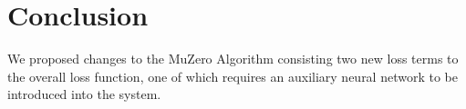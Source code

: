 \section{Conclusion}
We proposed changes to the MuZero Algorithm consisting two new loss terms to the overall loss function, one of which requires an auxiliary neural network to be introduced into the system.